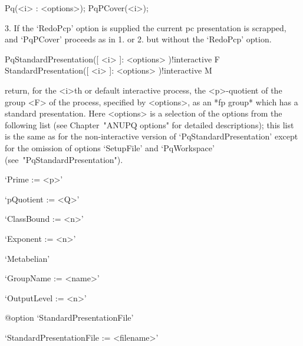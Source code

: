 Pq(<i> : <options>);
PqPCover(<i>);

\item{3.}
If the `RedoPcp' option  is  supplied  the  current  pc  presentation  is
scrapped, and `PqPCover'  proceeds  as  in  1.  or  2.  but  without  the
`RedoPcp' option.

\endlist

\>PqStandardPresentation([ <i> ]: <options> )!{interactive} F
\>StandardPresentation([ <i> ]: <options> )!{interactive} M

return, for the  <i>th  or  default  interactive  {\ANUPQ}  process,  the
<p>-quotient of the group <F> of the process, specified by <options>,  as
an *fp group* which has a standard  presentation.  Here  <options>  is  a
selection of the options from  the  following  list  (see  Chapter~"ANUPQ
options" for detailed descriptions); this list is the  same  as  for  the
non-interactive  version  of  `PqStandardPresentation'  except  for   the
omission     of      options      `SetupFile'      and      `PqWorkspace'
(see~"PqStandardPresentation").

\beginlist%

\item{}`Prime := <p>'

\item{}`pQuotient := <Q>'

\item{}`ClassBound := <n>'

\item{}`Exponent := <n>'

\item{}`Metabelian'

\item{}`GroupName := <name>'

\item{}`OutputLevel := <n>'

%
{@option \noexpand`StandardPresentationFile'}
\item{}`StandardPresentationFile := <filename>'

